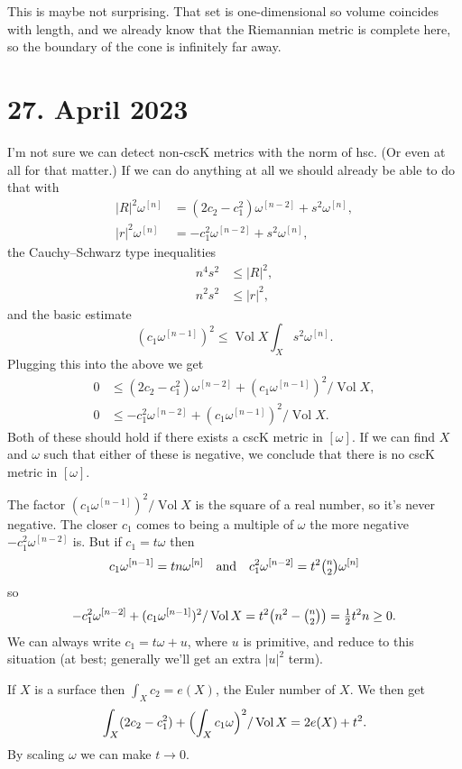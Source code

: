 \documentclass[11pt]{article}
\theoremstyle{definition}
\def\^#1{^{[#1]}}
\def\qandq{\quad\text{and}\quad}
\DeclareMathOperator{\Vol}{Vol}
\begin{document}
This is maybe not surprising.
That set is one-dimensional so volume coincides with length,
and we already know that the Riemannian metric is complete here, so the boundary of the cone is infinitely far away.

\section{27. April 2023}

I'm not sure we can detect non-cscK metrics with the norm of hsc.
(Or even at all for that matter.)
If we can do anything at all we should already be able to do that with
\begin{align*}
|R|^2 \omega\^{n}
&= (2c_2 - c_1^2) \omega\^{n-2} + s^2 \omega\^n,
\\
|r|^2 \omega\^{n}
&= -c_1^2 \omega\^{n-2} + s^2 \omega\^n,
\end{align*}
the Cauchy--Schwarz type inequalities
\begin{align*}
	n^4 s^2 &\leq |R|^2,
	\\
	n^2 s^2 &\leq |r|^2,
\end{align*}
and the basic estimate
$$
(c_1 \omega\^{n-1})^2 \leq
\Vol X \int_X s^2 \omega\^n.
$$
Plugging this into the above we get
\begin{align*}
0 &\leq (2c_2 - c_1^2) \omega\^{n-2} + (c_1 \omega\^{n-1})^2 / \Vol X,
\\
0 &\leq -c_1^2 \omega\^{n-2} + (c_1 \omega\^{n-1})^2 / \Vol X.
\end{align*}
Both of these should hold if there exists a cscK metric in $[\omega]$.
If we can find $X$ and $\omega$ such that either of these is negative,
we conclude that there is no cscK metric in $[\omega]$.

The factor $(c_1 \omega\^{n-1})^2 / \Vol X$ is the square of a real number,
so it's never negative.
The closer $c_1$ comes to being a multiple of $\omega$ the more negative $-c_1^2\omega\^{n-2}$ is.
But if $c_1 = t \omega$ then
$$
c_1 \omega\^{n-1} = tn \omega\^n
\qandq
c_1^2 \omega\^{n-2} = t^2 \tbinom{n}{2} \omega\^n
$$
so
$$
- c_1^2 \omega\^{n-2} + (c_1\omega\^{n-1})^2 / \Vol X
= t^2 \bigl(n^2 - \tbinom{n}{2}\bigr)
= \tfrac12 t^2 n \geq 0.
$$
We can always write $c_1 = t\omega + u$, where $u$ is primitive, and reduce to
this situation (at best; generally we'll get an extra $|u|^2$ term).

If $X$ is a surface then $\int_X c_2 = e(X)$, the Euler number of $X$.
We then get
$$
\int_X (2c_2 - c_1^2) + \Bigl(\int_X c_1\omega\Bigr)^2/\Vol X
= 2 e(X) + t^2.
$$
By scaling $\omega$ we can make $t \to 0$.
\end{document}
